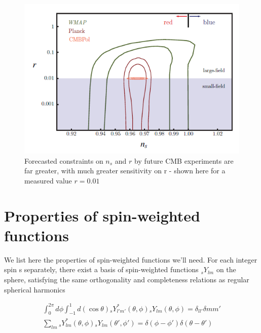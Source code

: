\documentclass[a4paper,10pt]{article}
\begin{document}
\begin{figure}[h]
  \includegraphics[width=\linewidth]{forecastconstraints.png}
  \caption{Forecasted constraints on $n_s$ and $r$ by future CMB experiments are far greater, with much greater sensitivity on r - shown here for a measured value $r=0.01$ }
\label{inflationconstraints}  
\end{figure}



































\appendix

\section{Properties of spin-weighted functions}
We list here the properties of spin-weighted functions we'll need. For each integer spin s separately, there exist a basis of spin-weighted functions $_sY_{lm}$ on the sphere, satisfying the same orthogonality and completeness relations as regular spherical harmonics

\begin{equation}
\begin{split}
\int_0^{2\pi} d\phi \int_{-1}^{1} d(\cos{\theta}) {}_sY_{l'm'}^*(\theta,\phi){}_sY_{lm}(\theta,\phi) = \delta_{ll'}\delta{mm'} \\
\sum_{lm} {}_sY_{lm}^*(\theta,\phi){}_sY_{lm}(\theta',\phi')=\delta(\phi-\phi')\delta(\theta-\theta')
\end{split}
\end{equation}
\end{document}
